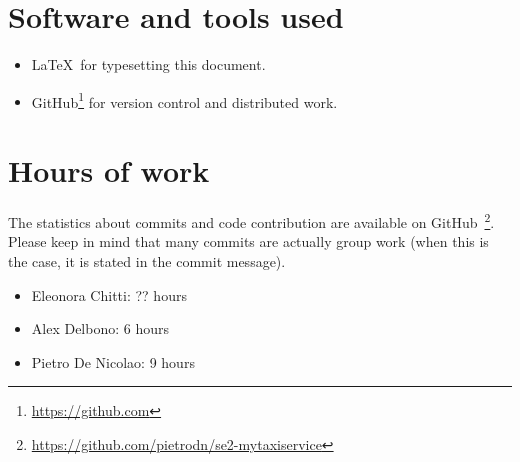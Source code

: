 \section{Software and tools used}
\begin{itemize}
    \item \LaTeX\, for typesetting this document.
    \item GitHub\footnote{\url{https://github.com}} for version control and distributed work.
\end{itemize}

\section{Hours of work}
The statistics about commits and code contribution are available on GitHub~\footnote{\url{https://github.com/pietrodn/se2-mytaxiservice}}.
Please keep in mind that many commits are actually group work (when this is the case, it is stated in the commit message).

\begin{itemize}
    \item Eleonora Chitti: ?? hours
    \item Alex Delbono: 6 hours
    \item Pietro De Nicolao: 9 hours
\end{itemize}
